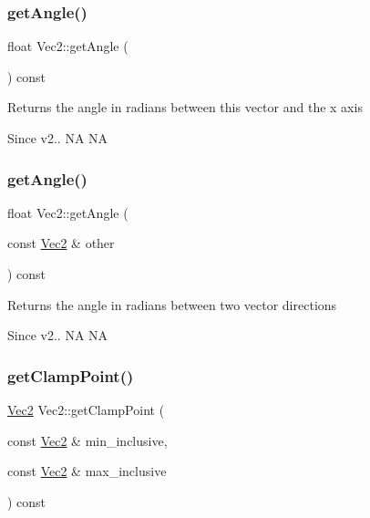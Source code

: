 \subsubsection{\texorpdfstring{get\+Angle()}{getAngle()}\hspace{0.1cm}{\footnotesize\ttfamily [3/4]}}
{\footnotesize\ttfamily float Vec2\+::get\+Angle (\begin{DoxyParamCaption}{ }\end{DoxyParamCaption}) const\hspace{0.3cm}{\ttfamily [inline]}}

\begin{DoxyReturn}{Returns}
the angle in radians between this vector and the x axis 
\end{DoxyReturn}
\begin{DoxySince}{Since}
v2..  NA  NA 
\end{DoxySince}
\mbox{\label{classVec2_a94017db9e730f5935efa27aee1bf7df7}} 
\subsubsection{\texorpdfstring{get\+Angle()}{getAngle()}\hspace{0.1cm}{\footnotesize\ttfamily [4/4]}}
{\footnotesize\ttfamily float Vec2\+::get\+Angle (\begin{DoxyParamCaption}\item[{const \hyperlink{classVec2}{Vec2} \&}]{other }\end{DoxyParamCaption}) const}

\begin{DoxyReturn}{Returns}
the angle in radians between two vector directions 
\end{DoxyReturn}
\begin{DoxySince}{Since}
v2..  NA  NA 
\end{DoxySince}
\mbox{\label{classVec2_aa51d29f01d1826b236669a718569ffd2}} 
\subsubsection{\texorpdfstring{get\+Clamp\+Point()}{getClampPoint()}\hspace{0.1cm}{\footnotesize\ttfamily [1/2]}}
{\footnotesize\ttfamily \hyperlink{classVec2}{Vec2} Vec2\+::get\+Clamp\+Point (\begin{DoxyParamCaption}\item[{const \hyperlink{classVec2}{Vec2} \&}]{min\+\_\+inclusive,  }\item[{const \hyperlink{classVec2}{Vec2} \&}]{max\+\_\+inclusive }\end{DoxyParamCaption}) const\hspace{0.3cm}{\ttfamily [inline]}}

